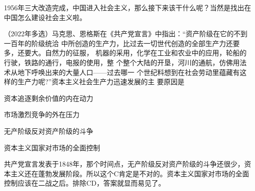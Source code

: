 \documentclass[lang=cn,blue,10pt,scheme=chinese,twocol]{zznote}
\begin{document}
\begin{solution}
	1956年三大改造完成，中国进入社会主义，那么接下来该干什么呢？当然是找出在中国怎么建设社会主义啦。
\end{solution}
\begin{example} （2022年多选）马克思、恩格斯在《共产党宣言》中指出：“资产阶级在它的不到一百年的阶级统洽
	中所创造的生产力，比过去一切世代创造的全部生产力还要多，还要大。自然力的征服，
	机器的采用，化学在工业和农业中的应用，轮船的行驶，铁路的通行，电报的使用，整
	个整个大陆的开垦，河川的通航，仿佛用法术从地下呼唤出来的大量人口——过去哪一
	个世纪料想到在社会劳动里蕴藏有这样的生产力呢?”资本主义社会生产力迅速发展的主
	要原因是

	\begin{choice}
		\item 资本追逐剩余价值的内在动力
		\item 市场激烈竞争的外在压力
		\item 无产阶级反对资产阶级的斗争
		\item 资本主义国家对市场的全面控制
	\end{choice}
\end{example}
\begin{solution}
	共产党宣言发表于1848年，那个时间点，无产阶级反对资产阶级的斗争还很少，资本主义还在蓬勃发展阶段。所以这个C肯定是不对的。资本主义国家对市场的全面控制应该在二战之后。排除CD，答案就显而易见了。
\end{solution}
\end{document}
